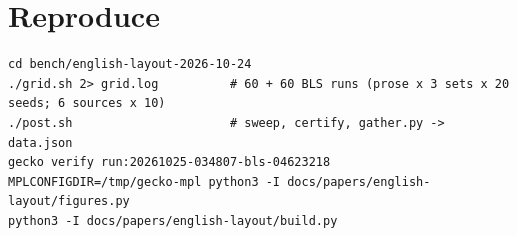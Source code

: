 \documentclass{gecko-paper}
\begin{document}
{\section{Reproduce}

\begin{verbatim}
cd bench/english-layout-2026-10-24
./grid.sh 2> grid.log          # 60 + 60 BLS runs (prose x 3 sets x 20 seeds; 6 sources x 10)
./post.sh                      # sweep, certify, gather.py -> data.json
gecko verify run:20261025-034807-bls-04623218
MPLCONFIGDIR=/tmp/gecko-mpl python3 -I docs/papers/english-layout/figures.py
python3 -I docs/papers/english-layout/build.py
\end{verbatim}

}
\end{document}
